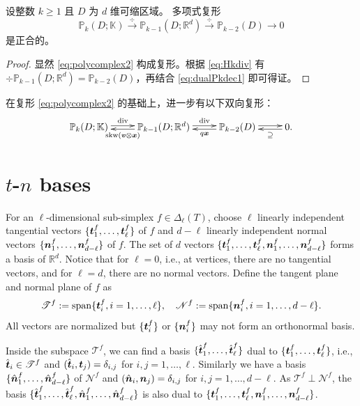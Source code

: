 \begin{lemma}
设整数 $k \geq 1$ 且 $D$ 为 $d$ 维可缩区域。 
多项式复形
\begin{equation}\label{eq:polycomplex2}
\mathbb P_k(D;\mathbb K)\xrightarrow{\div}\mathbb P_{k-1}(D;\mathbb R^d)\xrightarrow{\div}\mathbb P_{k-2}(D)\to0
\end{equation}
是正合的。
\end{lemma}
\begin{proof}
显然 \eqref{eq:polycomplex2} 构成复形。根据 \eqref{eq:Hkdiv} 有 $\div\mathbb P_{k-1}(D;\mathbb R^d)=\mathbb P_{k-2}(D)$，再结合 \eqref{eq:dualPkdec1} 即可得证。
\end{proof}

在复形 \eqref{eq:polycomplex2} 的基础上，进一步有以下双向复形：
\begin{equation*}
\xymatrix{
\mathbb P_{k}(D;\mathbb K)\ar@<0.4ex>[r]^-{\div}  & \mathbb P_{k-1}(D;\mathbb R^d)\ar@<0.4ex>[r]^-{\div}\ar@<0.4ex>[l]^-{\skw(\boldsymbol v\otimes\boldsymbol x)}  & \mathbb P_{k-2}(D) \ar@<0.4ex>[r]^-{}\ar@<0.4ex>[l]^-{ q\boldsymbol x} & 0 \ar@<0.4ex>[l]^-{ \supseteq}.
}
\end{equation*}

\section{$t$-$n$ bases}
For an $\ell$-dimensional sub-simplex $f\in \Delta_{\ell}(T)$, choose 
$\ell$ linearly independent tangential vectors $\{\boldsymbol t_1^f, \ldots, \boldsymbol t_{\ell}^f\}$ of $f$ and $d-\ell$ linearly independent normal vectors $\{\boldsymbol n_1^f, \ldots, \boldsymbol n_{d-\ell}^f\}$ of $f$.  
The set of $d$ vectors $\{\boldsymbol t_1^f, \ldots, \boldsymbol t_{\ell}^f, \boldsymbol n_1^f, \ldots, \boldsymbol n_{d-\ell}^f \}$ forms a basis of $\mathbb R^d$.
Notice that for $\ell = 0$, i.e., at vertices, there are no tangential vectors, and for $\ell = d$, there are no normal vectors. Define the tangent plane and normal plane of $f$ as 
\begin{equation*}
\mathscr T^f := {\rm span} \{\boldsymbol t_i^f, i=1, \ldots, \ell \},
\quad
\mathscr{N}^f :=  {\rm span} \{\boldsymbol n_i^f, i=1, \ldots, d-\ell \}.
\end{equation*}
All vectors are normalized but $\{\boldsymbol t_i^f\}$ or $\{ \boldsymbol n_i^f\}$ may not form an orthonormal basis. 

Inside the subspace $\mathscr T^f$, we can find a basis $\{\hat{\boldsymbol t}_1^f, \ldots, \hat{\boldsymbol t}_{\ell}^f\}$ dual to $\{\boldsymbol t_1^f, \ldots, \boldsymbol t_{\ell}^f\}$, i.e., $\hat{\boldsymbol t}_i\in \mathscr T^f$ and $(\hat{\boldsymbol t}_i, \boldsymbol t_j)=\delta_{i,j}$ for $i, j=1,\ldots,\ell$. Similarly we have a basis $\{\hat{\boldsymbol n}_1^f, \ldots, \hat{\boldsymbol n}_{d-\ell}^f\}$ of $\mathscr N^f$ and  $(\hat{\boldsymbol n}_i, \boldsymbol n_j)=\delta_{i,j}$ for $i, j=1,\ldots, d-\ell$. As $\mathscr T^f \perp \mathscr N^f$, the basis  $\{\hat{\boldsymbol t}_1^f, \ldots, \hat{\boldsymbol t}_{\ell}^f, \hat{\boldsymbol n}_{1}^f, \ldots, \hat{\boldsymbol n}_{d-\ell}^f\}$ is also dual to  $\{\boldsymbol t_1^f, \ldots, \boldsymbol t_{\ell}^f, \boldsymbol n_{1}^f, \ldots, \boldsymbol n_{d-\ell}^f\}$. 


